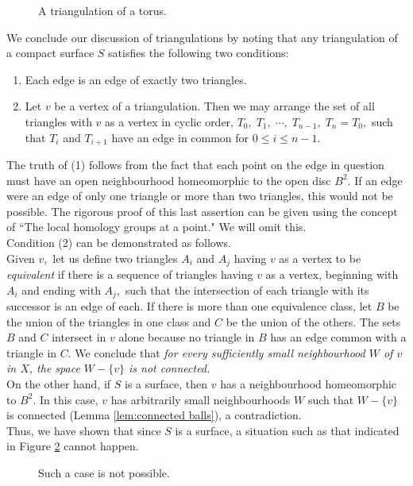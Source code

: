 \documentclass{article}
\theoremstyle{definition}
\begin{document}
\begin{figure}[!htb]
  \centering
  
  \caption{A triangulation of a torus.}
  \label{fig:torus triang}
\end{figure}
We conclude our discussion of triangulations by noting that any triangulation of a compact surface $S$ satisfies the following two conditions:
\begin{enumerate}[nosep, label = (\arabic*)] 
  \item Each edge is an edge of exactly two triangles.
  \item Let $v$ be a vertex of a triangulation. Then we may arrange the set of all triangles with $v$ as a vertex in cyclic order, $T_0,\; T_1,\; \cdots,\; T_{n-1},\; T_n = T_0,$ such that $T_i$ and $T_{i+1}$ have an edge in common for $0 \le i \le n-1.$
\end{enumerate}
The truth of (1) follows from the fact that each point on the edge in question must have an open neighbourhood homeomorphic to the open disc $B^2.$ If an edge were an edge of only one triangle or more than two triangles, this would not be possible. The rigorous proof of this last assertion can be given using the concept of ``The local homology groups at a point." We will omit this.\\
Condition (2) can be demonstrated as follows.\\
Given $v,$ let us define two triangles $A_i$ and $A_j$ having $v$ as a vertex to be \emph{equivalent} if there is a sequence of triangles having $v$ as a vertex, beginning with $A_i$ and ending with $A_j,$ such that the intersection of each triangle with its successor is an edge of each. If there is more than one equivalence class, let $B$ be the union of the triangles in one class and $C$ be the union of the others. The sets $B$ and $C$ intersect in $v$ alone because no triangle in $B$ has an edge common with a triangle in $C.$ We conclude that \emph{for every sufficiently small neighbourhood $W$ of $v$ in $X$, the space $W-\{v\}$ is not connected.}\\
On the other hand, if $S$ is a surface, then $v$ has a neighbourhood homeomorphic to $B^2.$ In this case, $v$ has arbitrarily small neighbourhoods $W$ such that $W - \{v\}$ is connected (Lemma \ref{lem:connected balls}), a contradiction.\\
Thus, we have shown that since $S$ is a surface, a situation such as that indicated in Figure \ref{fig:triang vertex} cannot happen.

\begin{figure}[!htb]
  \centering
  
  \caption{Such a case is not possible.}
  \label{fig:triang vertex}
\end{figure}
%
\newpage
\end{document}
